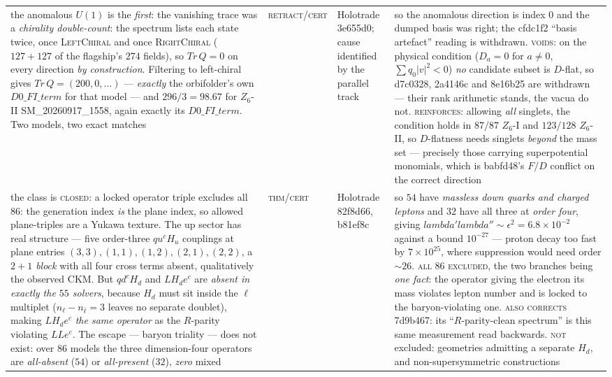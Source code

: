\documentclass[12pt,a4paper]{article}
\def\mathbb#1{#1}%
\def\mathrm#1{#1}%
\def\textbf#1{#1}%
\def\texttt#1{#1}%
\def\lambda{lambda}%
\theoremstyle{definition}
\newcommand{\ZZ}{\mathbb{Z}}
\begin{document}
\begin{center}
\begin{tabular}{@{}p{}llp{}@{}}
\textbf{the anomalous $U(1)$ is the \emph{first}: the vanishing trace was a \emph{chirality double-count}}: the spectrum lists each state twice, once \textsc{LeftChiral} and once \textsc{RightChiral} ($127{+}127$ of the flagship's $274$ fields), so $\mathrm{Tr}\,Q=0$ on every direction \emph{by construction}. Filtering to left-chiral gives $\mathrm{Tr}\,Q=(200,0,\ldots)$ --- \emph{exactly} the orbifolder's own $D0\_FI\_term$ for that model --- and $296/3=98.67$ for $\ZZ_6$-II \texttt{SM\_20260917\_1558}, again exactly its $D0\_FI\_term$. Two models, two exact matches & \textsc{retract}/\textsc{cert} & Holotrade \texttt{3e655d0}; cause identified by the parallel track & so the anomalous direction is index $0$ and the dumped basis was right; the \texttt{cfdc1f2} ``basis artefact'' reading is withdrawn. \textsc{voids}: on the physical condition ($D_a{=}0$ for $a\neq0$, $\sum q_0|v|^2<0$) \emph{no} candidate subset is $D$-flat, so \texttt{d7c0328}, \texttt{2a4146c} and \texttt{8e16b25} are withdrawn --- their rank arithmetic stands, the vacua do not. \textsc{reinforces}: allowing \emph{all} singlets, the condition holds in $87/87$ $\ZZ_6$-I and $123/128$ $\ZZ_6$-II, so $D$-flatness needs singlets \emph{beyond} the mass set --- precisely those carrying superpotential monomials, which is \texttt{babfd48}'s $F/D$ conflict on the correct direction \\
\textbf{the class is \textsc{closed}: a locked operator triple excludes all $86$}: the generation index \emph{is} the plane index, so allowed plane-triples are a Yukawa texture. The up sector has real structure --- five order-three $qu^cH_u$ couplings at plane entries $(3,3),(1,1),(1,2),(2,1),(2,2)$, a \emph{$2{+}1$ block} with all four cross terms absent, qualitatively the observed CKM. But $qd^cH_d$ and $LH_de^c$ are \emph{absent in exactly the $55$ solvers}, because $H_d$ must sit inside the $\ell$ multiplet ($n_\ell-n_{\bar\ell}=3$ leaves no separate doublet), making $LH_de^c$ \emph{the same operator} as the $R$-parity violating $LLe^c$. The escape --- baryon triality --- does not exist: over $86$ models the three dimension-four operators are \emph{all-absent} ($54$) or \emph{all-present} ($32$), \emph{zero} mixed & \textsc{thm}/\textsc{cert} & Holotrade \texttt{82f8d66}, \texttt{b81ef8c} & so $54$ have \emph{massless down quarks and charged leptons} and $32$ have all three at \emph{order four}, giving $\lambda'\lambda''\!\sim\!\epsilon^2=6.8\times10^{-2}$ against a bound $10^{-27}$ --- proton decay too fast by $7\times10^{25}$, where suppression would need order ${\sim}26$. \textsc{all 86 excluded}, the two branches being \emph{one fact}: the operator giving the electron its mass violates lepton number and is locked to the baryon-violating one. \textsc{also corrects} \texttt{7d9b467}: its ``$R$-parity-clean spectrum'' is this same measurement read backwards. \textsc{not} excluded: geometries admitting a separate $H_d$, and non-supersymmetric constructions \\

\end{tabular}
\end{center}
\end{document}
